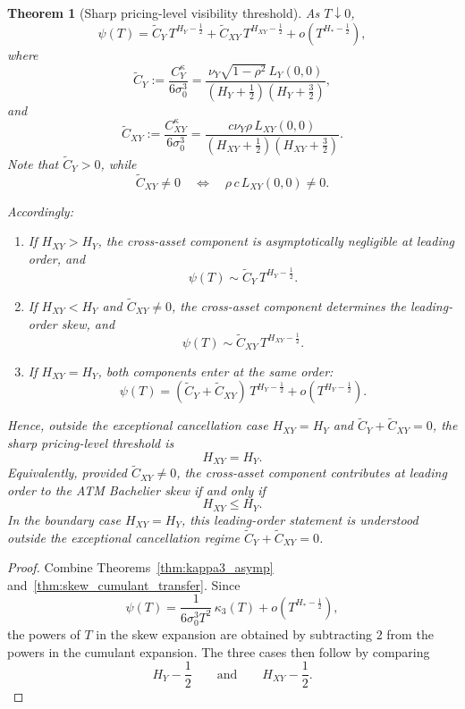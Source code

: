 \documentclass[11pt,a4paper]{amsart}
\theoremstyle{plain}
\newtheorem{theorem}{Theorem}[section]
\theoremstyle{definition}
\theoremstyle{remark}
\begin{document}
\begin{theorem}[Sharp pricing-level visibility threshold]\label{thm:Q_threshold_final}
As $T\downarrow0$,
\[
\psi(T)
=
\widetilde C_Y\,T^{H_Y-\frac12}
+
\widetilde C_{XY}\,T^{H_{XY}-\frac12}
+
o\!\left(T^{H_*-\frac12}\right),
\]
where
\[
\widetilde C_Y := \frac{C_Y^\kappa}{6\sigma_0^3}
=
\frac{\nu_Y\sqrt{1-\rho^2}\,L_Y(0,0)}
{\left(H_Y+\frac12\right)\left(H_Y+\frac32\right)},
\]
and
\[
\widetilde C_{XY} := \frac{C_{XY}^\kappa}{6\sigma_0^3}
=
\frac{c\nu_Y\rho\,L_{XY}(0,0)}
{\left(H_{XY}+\frac12\right)\left(H_{XY}+\frac32\right)}.
\]
Note that $\widetilde C_Y>0$, while
\[
\widetilde C_{XY}\neq 0
\quad\Longleftrightarrow\quad
\rho\, c\, L_{XY}(0,0)\neq 0.
\]

Accordingly:
\begin{enumerate}
\item If $H_{XY}>H_Y$, the cross-asset component is asymptotically negligible at leading order, and
\[
\psi(T)\sim \widetilde C_Y\,T^{H_Y-\frac12}.
\]

\item If $H_{XY}<H_Y$ and $\widetilde C_{XY}\neq0$, the cross-asset component determines the leading-order skew, and
\[
\psi(T)\sim \widetilde C_{XY}\,T^{H_{XY}-\frac12}.
\]

\item If $H_{XY}=H_Y$, both components enter at the same order:
\[
\psi(T)
=
(\widetilde C_Y+\widetilde C_{XY})\,T^{H_Y-\frac12}
+
o\!\left(T^{H_Y-\frac12}\right).
\]
\end{enumerate}

Hence, outside the exceptional cancellation case $H_{XY}=H_Y$ and $\widetilde C_Y+\widetilde C_{XY}=0$, the sharp pricing-level threshold is
\[
H_{XY}=H_Y.
\]
Equivalently, provided $\widetilde C_{XY}\neq0$, the cross-asset component contributes at leading order to the ATM Bachelier skew if and only if
\[
H_{XY}\le H_Y.
\]
In the boundary case $H_{XY}=H_Y$, this leading-order statement is understood outside the
exceptional cancellation regime $\widetilde C_Y+\widetilde C_{XY}=0$.
\end{theorem}

\begin{proof}
Combine Theorems~\ref{thm:kappa3_asymp} and~\ref{thm:skew_cumulant_transfer}. Since
\[
\psi(T)
=
\frac{1}{6\sigma_0^3T^2}\,\kappa_3(T)
+
o\!\left(T^{H_* - \frac12}\right),
\]
the powers of $T$ in the skew expansion are obtained by subtracting $2$ from the powers in the cumulant expansion. The three cases then follow by comparing
\[
H_Y-\frac12
\qquad\text{and}\qquad
H_{XY}-\frac12.
\]
\end{proof}
\end{document}
